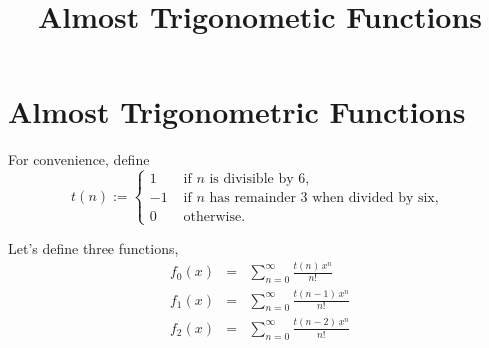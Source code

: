 \documentclass[12pt]{article}
\title{Almost Trigonometic Functions}
\begin{document}
\section{Almost Trigonometric Functions}

For convenience, define
$$
t(n) := \begin{cases}
1 & \mbox{ if $n$ is divisible by 6, } \\
-1 & \mbox{ if $n$ has remainder 3 when divided by six, } \\
0 & \mbox{ otherwise. }
\end{cases}
$$

Let's define three functions,
\begin{eqnarray*}
f_0(x) &=& \sum_{n=0}^\infty \frac{t(n) \, x^n}{n!} \\
f_1(x) &=& \sum_{n=0}^\infty \frac{t(n - 1) \, x^n}{n!} \\
f_2(x) &=& \sum_{n=0}^\infty \frac{t(n - 2) \, x^n}{n!}
\end{eqnarray*}
\end{document}

